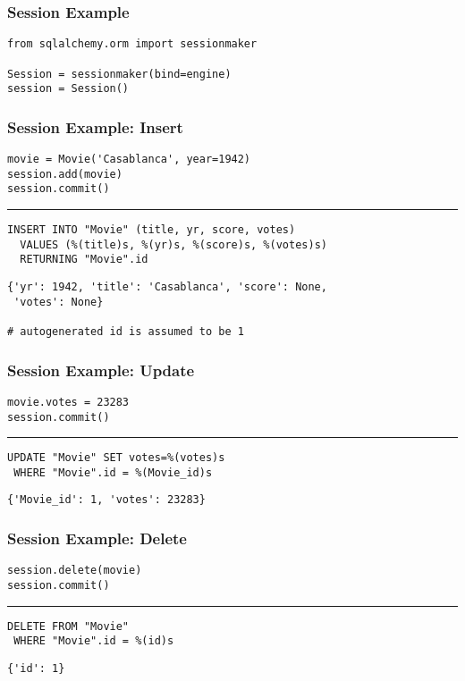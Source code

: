 \documentclass[dvipsnames]{beamer}
\theoremstyle{plain}
\begin{document}
\begin{frame}[fragile]
  \frametitle{Session Example}

  \begin{lstlisting}
from sqlalchemy.orm import sessionmaker

Session = sessionmaker(bind=engine)
session = Session()
  \end{lstlisting}
\end{frame}

\begin{frame}[fragile]
  \frametitle{Session Example: Insert}

  \begin{lstlisting}
movie = Movie('Casablanca', year=1942)
session.add(movie)
session.commit()
  \end{lstlisting}
  \hrule

  \begin{lstlisting}[language=FullSQL]
INSERT INTO "Movie" (title, yr, score, votes)
  VALUES (%(title)s, %(yr)s, %(score)s, %(votes)s)
  RETURNING "Movie".id
  \end{lstlisting}

  \begin{lstlisting}
{'yr': 1942, 'title': 'Casablanca', 'score': None,
 'votes': None}

# autogenerated id is assumed to be 1
  \end{lstlisting}
\end{frame}

\begin{frame}[fragile]
  \frametitle{Session Example: Update}

  \begin{lstlisting}
movie.votes = 23283
session.commit()
  \end{lstlisting}
  \hrule

  \begin{lstlisting}[language=FullSQL]
UPDATE "Movie" SET votes=%(votes)s
 WHERE "Movie".id = %(Movie_id)s
  \end{lstlisting}

  \begin{lstlisting}
{'Movie_id': 1, 'votes': 23283}
  \end{lstlisting}
\end{frame}

\begin{frame}[fragile]
  \frametitle{Session Example: Delete}

  \begin{lstlisting}
session.delete(movie)
session.commit()
  \end{lstlisting}
  \hrule

  \begin{lstlisting}[language=FullSQL]
DELETE FROM "Movie"
 WHERE "Movie".id = %(id)s
  \end{lstlisting}

  \begin{lstlisting}
{'id': 1}
  \end{lstlisting}
\end{frame}
\end{document}
